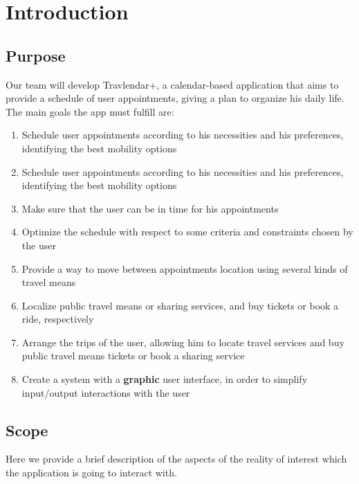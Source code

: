 \chapter{Introduction}

\section{Purpose}

Our team will develop Travlendar+, a calendar-based application that aims to provide a schedule of user appointments, giving a plan to organize his daily life.
The main goals the app must fulfill are:

\begin{enumerate}
\renewcommand\labelenumi{\textbf{G\theenumi}}
\item Schedule user appointments according to his necessities and his preferences, identifying the best mobility options \label{goal:G1}
\item Schedule user appointments according to his necessities and his preferences, identifying the best mobility options \label{goal:G2}
\item Make sure that the user can be in time for his appointments \label{goal:G3}
\item Optimize the schedule with respect to some criteria and constraints chosen by the user \label{goal:G4}
\item Provide a way to move between appointments location using several kinds of travel means \label{goal:G5}
\item Localize public travel means or sharing services, and buy tickets or book a ride, respectively \label{goal:G6}
\item Arrange the trips of the user, allowing him to locate travel services and buy public travel means tickets or book a sharing service \label{goal:G7}
\item Create a system with a \textbf{graphic} user interface, in order to simplify input/output interactions with the user \label{goal:G8}
\end{enumerate}

\section{Scope}
Here we provide a brief description of the aspects of the reality of interest which the application is going to interact with.

